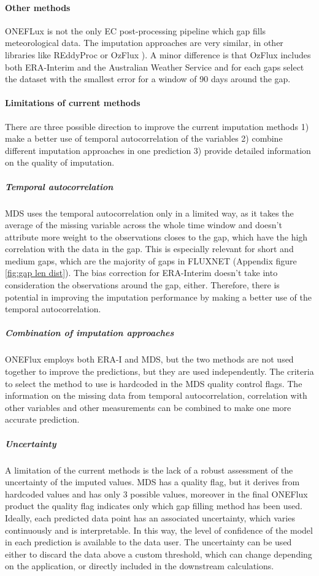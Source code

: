 \documentclass{article}
\begin{document}
\paragraph{Other methods} ONEFLux is not the only EC post-processing pipeline which gap fills meteorological data. The imputation approaches are very similar, in other libraries like REddyProc \cite{wutzler_basic_2018} or OzFlux \cite{isaac_ozflux_2017}). A minor difference is that OzFlux includes both ERA-Interim and the Australian Weather Service and for each gaps select the dataset with the smallest error for a window of 90 days around the gap.
\pagebreak
\paragraph{Limitations of current methods} There are three possible direction to improve the current imputation methods  1) make a better use of temporal autocorrelation of the variables 2) combine different imputation approaches in one prediction  3) provide detailed information on the quality of imputation.

\subparagraph{Temporal autocorrelation} MDS uses the temporal autocorrelation only in a limited way, as it takes the average of the missing variable across the whole time window and doesn't attribute more weight to the observations closes to the gap, which have the high correlation with the data in the gap. This is especially relevant for short and medium gaps, which are the majority of gaps in FLUXNET (Appendix figure \ref{fig:gap len dist}). The bias correction for ERA-Interim doesn't take into consideration the observations around the gap, either. Therefore, there is potential in improving the imputation performance by making a better use of the temporal autocorrelation.

\subparagraph{Combination of imputation approaches} ONEFlux employs both ERA-I and MDS, but the two methods are not used together to improve the predictions, but they are used independently. The criteria to select the method to use is hardcoded in the MDS quality control flags. The information on the missing data from temporal autocorrelation, correlation with other variables and other measurements can be combined to make one more accurate prediction.

\subparagraph{Uncertainty} A limitation of the current methods is the lack of a robust assessment of the uncertainty of the imputed values. MDS has a quality flag, but it derives from hardcoded values and has only 3 possible values, moreover in the final ONEFlux product the quality flag indicates only which gap filling method has been used. Ideally, each predicted data point has an associated uncertainty, which varies continuously and is interpretable. In this way, the level of confidence of the model in each prediction is available to the data user. The uncertainty can be used either to discard the data above a custom threshold, which can change depending on the application, or directly included in the downstream calculations.
\end{document}
